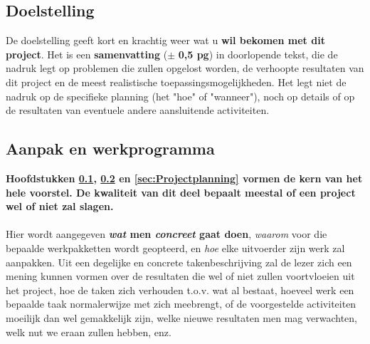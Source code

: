 \documentclass[]{book}
\begin{document}
\subsection{Doelstelling}\label{sec:Doelstelling}
De doelstelling geeft kort en krachtig weer wat u \textbf{wil bekomen met dit project}. Het is een \textbf{samenvatting} ($\pm$ \textbf{0,5 pg}) in doorlopende tekst, die de nadruk legt op problemen die zullen opgelost worden, de verhoopte resultaten van dit project en de meest realistische toepassingsmogelijkheden. Het legt niet de nadruk op de specifieke planning (het "hoe" of "wanneer"), noch op details of op de resultaten van eventuele andere aansluitende activiteiten. 


\subsection{Aanpak en werkprogramma}\label{sec:Aanpak}

\textbf{Hoofdstukken \ref{sec:Doelstelling}, \ref{sec:Aanpak} en \ref{sec:Projectplanning} vormen de kern van het hele voorstel. De kwaliteit van dit deel bepaalt meestal of een project wel of niet zal slagen. }\\
\\
Hier wordt aangegeven \textbf{\emph{wat} men \emph{concreet} gaat doen}, \emph{waarom} voor die bepaalde werkpakketten wordt geopteerd, en \emph{hoe} elke uitvoerder zijn werk zal aanpakken. Uit een degelijke en concrete takenbeschrijving zal de lezer zich een mening kunnen vormen over de resultaten die wel of niet zullen voortvloeien uit het project, hoe de taken zich verhouden t.o.v. wat al bestaat, hoeveel werk een bepaalde taak normalerwijze met zich meebrengt, of de voorgestelde activiteiten moeilijk dan wel gemakkelijk zijn, welke nieuwe resultaten men mag verwachten, welk nut we eraan zullen hebben, enz.
\end{document}
